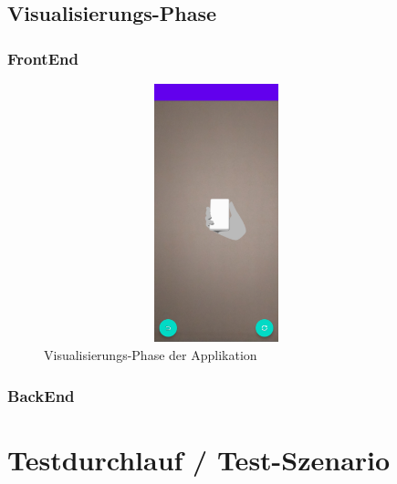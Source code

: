 \subsection{Visualisierungs-Phase} 
\subsubsection{FrontEnd}
\begin{figure}[hbt!]
    \centering
    \includegraphics[width=10cm,height=7.5cm,keepaspectratio]{4Umsetzung/Bilder/visual-phase.jpg}
    \caption{Visualisierungs-Phase der Applikation}
    \label{pic:visual}
\end{figure}
\subsubsection{BackEnd}

\section{Testdurchlauf / Test-Szenario}
\label{chap:testdurchlauf}